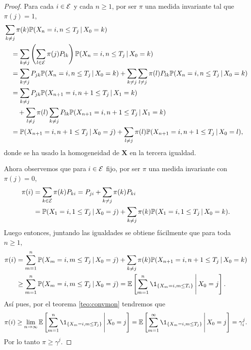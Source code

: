 \begin{proof}
    Para cada $i \in \mathcal{E}$ y cada $n \geq 1$, por ser $\pi$ una medida invariante tal que $\pi(j) = 1$,
    \begin{align*}
        & \sum_{k \neq j} \pi(k) \mathbb{P}(X_n = i, n \leq T_j \,\vert\, X_0 = k) \\ 
        & \quad = \sum_{k \neq j} \left(\sum_{l \in \mathcal{E}} \pi(j) P_{lk} \right) \mathbb{P}(X_n = i, n \leq T_j \,\vert\, X_0 = k) \\
        & \quad = \sum_{k \neq j} P_{jk} \mathbb{P}(X_n = i, n \leq T_j \,\vert\, X_0 = k) + \sum_{k \neq j} \sum_{l \neq j} \pi(l) P_{lk} \mathbb{P}(X_n = i, n \leq T_j \,\vert\, X_0 = k) \\
        & \quad = \sum_{k \neq j} P_{jk} \mathbb{P}(X_{n+1} = i, n+1 \leq T_j \,\vert\, X_1 = k) \\
        & \qquad + \sum_{l \neq j} \pi(l) \sum_{k \neq j} P_{lk} \mathbb{P}(X_{n+1} = i, n+1 \leq T_j \,\vert\, X_1 = k) \\
        & \quad = \mathbb{P}(X_{n+1} = i, n+1 \leq T_j \,\vert\, X_0 = j) + \sum_{l \neq j} \pi(l) \mathbb{P}(X_{n+1} = i, n+1 \leq T_j \,\vert\, X_0 = l),
    \end{align*}
    donde se ha usado la homogeneidad de $\bm X$ en la tercera igualdad. 

    Ahora observemos que para $i \in \mathcal{E}$ fijo, por ser $\pi$ una medida invariante con $\pi(j) = 0$,
    \begin{align*}
        \pi(i) & = \sum_{k \in \mathcal{E}} \pi(k) P_{ki} = P_{ji} + \sum_{k \neq j} \pi(k) P_{ki} \\
        & = \mathbb{P}(X_1 = i, 1 \leq T_j \,\vert\, X_0 = j) + \sum_{k \neq j} \pi(k) \mathbb{P}(X_1 = i, 1 \leq T_j \,\vert\, X_0 = k).
    \end{align*}
    Luego entonces, juntando las igualdades se obtiene fácilmente que para toda $n \geq 1$,
    \begin{align*}
        \pi(i) & = \sum_{m = 1}^n \PP(X_m = i, m \leq T_j \,\vert\, X_0 = j) + \sum_{k \neq j} \pi(k) \PP(X_{n+1} = i, n+1 \leq T_j \,\vert\, X_0 = k) \\
        & \geq \sum_{m = 1}^n \PP(X_m = i, m \leq T_j \,\vert\, X_0 = j) = \EE \left[\sum_{m = 1}^n \1_{\{X_m = i, m \leq T_i\}} \,\Bigg\vert\, X_0 = j \right].
    \end{align*}
    Así pues, por el teorema \ref{teo:convmon} tendremos que 
    \[
        \pi(i) \geq \lim_{n \to \infty } \EE \left[\sum_{m = 1}^n \1_{\{X_m = i, m \leq T_j\}} \,\Bigg\vert\, X_0 = j \right] = \EE \left[\sum_{m = 1}^\infty \1_{\{X_m = i, m \leq T_j\}} \,\Bigg\vert\, X_0 = j \right] = \gamma_i^j.
    \]
    Por lo tanto $\pi \geq \gamma^j$.


\end{proof}
